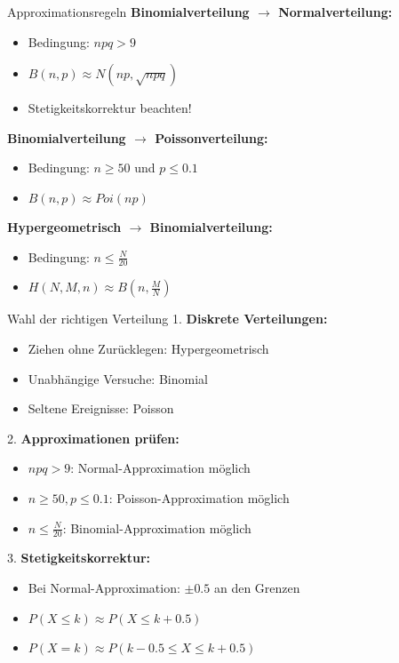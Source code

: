 \begin{concept}{Approximationsregeln}
\textbf{Binomialverteilung $\rightarrow$ Normalverteilung:}
\begin{itemize}
    \item Bedingung: $npq > 9$
    \item $B(n,p) \approx N(np, \sqrt{npq})$
    \item Stetigkeitskorrektur beachten!
\end{itemize}

\textbf{Binomialverteilung $\rightarrow$ Poissonverteilung:}
\begin{itemize}
    \item Bedingung: $n \geq 50$ und $p \leq 0.1$
    \item $B(n,p) \approx Poi(np)$
\end{itemize}

\textbf{Hypergeometrisch $\rightarrow$ Binomialverteilung:}
\begin{itemize}
    \item Bedingung: $n \leq \frac{N}{20}$
    \item $H(N,M,n) \approx B(n,\frac{M}{N})$
\end{itemize}
\end{concept}

\begin{KR}{Wahl der richtigen Verteilung}
1. \textbf{Diskrete Verteilungen:}
   \begin{itemize}
   \item Ziehen ohne Zurücklegen: Hypergeometrisch
   \item Unabhängige Versuche: Binomial
   \item Seltene Ereignisse: Poisson
   \end{itemize}

2. \textbf{Approximationen prüfen:}
   \begin{itemize}
   \item $npq > 9$: Normal-Approximation möglich
   \item $n \geq 50, p \leq 0.1$: Poisson-Approximation möglich
   \item $n \leq \frac{N}{20}$: Binomial-Approximation möglich
   \end{itemize}

3. \textbf{Stetigkeitskorrektur:}
   \begin{itemize}
   \item Bei Normal-Approximation: $\pm 0.5$ an den Grenzen
   \item $P(X \leq k) \approx P(X \leq k + 0.5)$
   \item $P(X = k) \approx P(k - 0.5 \leq X \leq k + 0.5)$
   \end{itemize}
\end{KR}